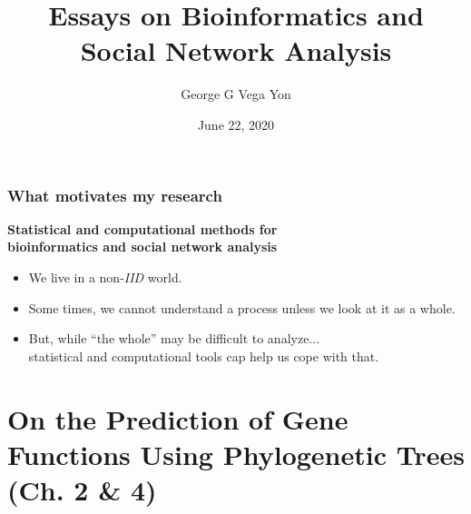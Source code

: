 \documentclass[aspectratio=169, 9pt]{beamer}
\title[Stat. Comp. for Complex Systems]{Essays on Bioinformatics and
Social Network Analysis
\linebreak{\small Statistical and Computational Methods for
Complex Systems}}
\author[GGVY]{George G Vega Yon}
\institute[USC-PREVMED]{University of Southern California, Department of Preventive Medicine}
\date{June 22, 2020}
\begin{document}
\begin{frame}%
\maketitle
\end{frame}

\begin{frame}
\frametitle{What motivates my research}

\begin{center}
\large
\textcolor{usccardinal}{\bf Statistical and computational methods for\\ %
bioinformatics and social network analysis}
\end{center}\pause

\begin{itemize}
\item We live in a non-{\it IID} world.\pause
\item Some times, we cannot understand a process unless we look at it as a whole.\pause
\item But, while ``the whole'' may be difficult to analyze...\\
\hfill {} statistical and computational tools cap help us cope with that.
\end{itemize}
\end{frame}



\section{On the Prediction of Gene Functions Using Phylogenetic Trees (Ch. 2 \& 4)}

\end{document}
